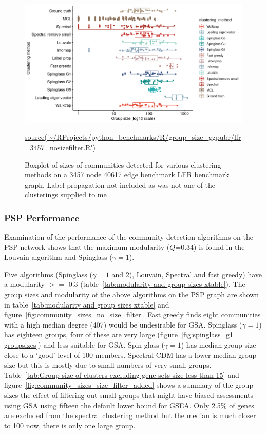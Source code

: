  \begin{figure}
      \centering
      \includegraphics[width=\textwidth]{images/chapter_community_detection/ggplot2/LFR/Rplot_cluster_legend.png}
      \caption{Boxplot of sizes of communities detected for various clustering methods on a 3457 node 40617 edge benchmark LFR benchmark graph. Label propagation not included as was not one of the clusterings supplied to me}
      \tiny\url{source('~/RProjects/python_benchmarks/R/group_size_ggpubr/lfr_3457_nosizefilter.R')}
      \label{fig:boxplot group size lfr clustering methods}
  \end{figure}
 

\clearpage
\subsubsection{PSP Performance}

\label{sec:Performance on PSP graph}
Examination of the performance of the community detection algorithms on the PSP network shows that the maximum modularity ($Q$=0.34) is found in the Louvain algorithm and Spinglass ($\gamma=1$). 

Five algorithms (Spinglass ($\gamma=1$ and 2), Louvain, Spectral and fast greedy) have a modularity $>=$ 0.3 (table~\ref{tab:modularity and group sizes xtable}). The group sizes and modularity of the above algorithms on the PSP graph are shown in table~\ref{tab:modularity and group sizes xtable} and figure~\ref{fig:community_sizes_no_size_filter}. Fast greedy finds eight communities with a high median degree (407) would be undesirable for GSA. Spinglass ($\gamma=1$) has eighteen groups, four of these are very large (figure~\ref{fig:spinglass_g1 groupsizes}) and less suitable for GSA. Spin glass ($\gamma=1$)  has median group size close to a `good' level of 100 members\cite{leskovec2010empirical}. Spectral CDM has a lower median group size but this is mostly due to small numbers of very small groups.
Table~\ref{tab:Group size of clusters excluding gene sets size less than 15} and figure~\ref{fig:community_sizes_size_filter_added} shows a summary of the group sizes the effect of filtering out small groups that might have biased assessments using GSA\cite{de2016statistical} using fifteen the default lower bound for GSEA. Only 2.5\% of genes are excluded from the spectral clustering method but the median is much closer to 100 now, there is only one large group. 

